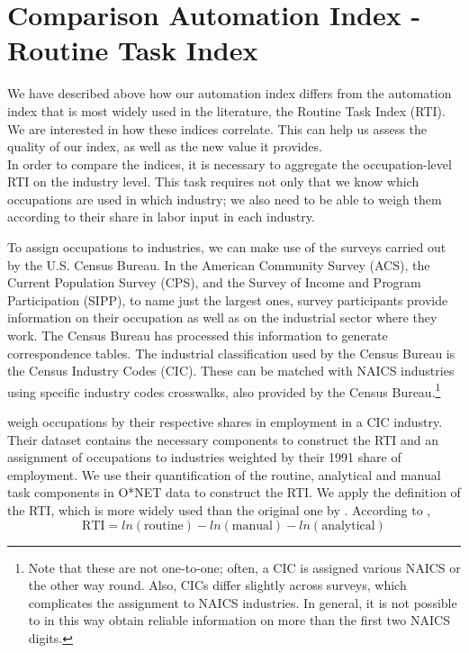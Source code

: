 \documentclass[11pt,a4paper]{article}
\begin{document}
\section{Comparison Automation Index - Routine Task Index}

We have described above how our automation index differs from the automation index that is most widely used in the literature, the Routine Task Index (RTI). We are interested in how these indices correlate. This can help us assess the quality of our index, as well as the new value it provides.\\
In order to compare the indices, it is necessary to aggregate the occupation-level RTI on the industry level. This task requires not only that we know which occupations are used in which industry; we also need to be able to weigh them according to their share in labor input in each industry.

To assign occupations to industries, we can make use of the surveys carried out by the U.S. Census Bureau. In the American Community Survey (ACS), the Current Population Survey (CPS), and the Survey of Income and Program Participation (SIPP), to name just the largest ones, survey participants provide information on their occupation as well as on the industrial sector where they work. The Census Bureau has processed this information to generate correspondence tables. The industrial classification used by the Census Bureau is the Census Industry Codes (CIC). These can be matched with NAICS industries using specific industry codes crosswalks, also provided by the Census Bureau.\footnote{Note that these are not one-to-one; often, a CIC is assigned various NAICS or the other way round. Also, CICs differ slightly across surveys, which complicates the assignment to NAICS industries. In general, it is not possible to in this way obtain reliable information on more than the first two NAICS digits.}

\cite{ALM2003} weigh occupations by their respective shares in employment in a CIC industry. Their dataset contains the necessary components to construct the RTI and an assignment of occupations to industries weighted by their 1991 share of employment. We use their quantification of the routine, analytical and manual task components in O*NET data to construct the RTI. We apply the \cite{AD2013} definition of the RTI, which is more widely used than the original one by \cite{ALM2003}. According to \cite{AD2013},
\begin{equation}
 \text{RTI} = ln(\text{routine}) - ln(\text{manual}) - ln(\text{analytical})
\end{equation}  
\end{document}
